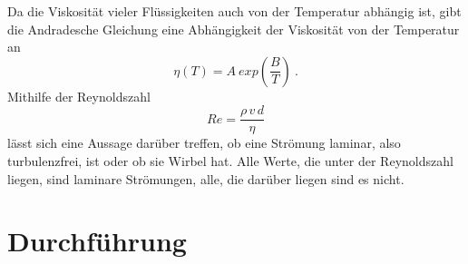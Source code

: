 Da die Viskosität vieler Flüssigkeiten auch von der Temperatur abhängig ist, gibt die
Andradesche Gleichung eine Abhängigkeit der Viskosität von der Temperatur an
\begin{equation}
  \eta(T) = A \ exp\left(\frac{B}{T}\right) \ .
  \label{eqn:5}
\end{equation}
Mithilfe der Reynoldszahl
\begin{equation}
  Re = \frac{\rho \, v \, d}{\eta}
  \label{eqn:6}
\end{equation}
lässt sich eine Aussage darüber treffen, ob eine Strömung laminar, also turbulenzfrei,
ist oder ob sie Wirbel hat. Alle Werte, die unter der Reynoldszahl liegen, sind laminare
Strömungen, alle, die darüber liegen sind es nicht.

\section{Durchführung}
